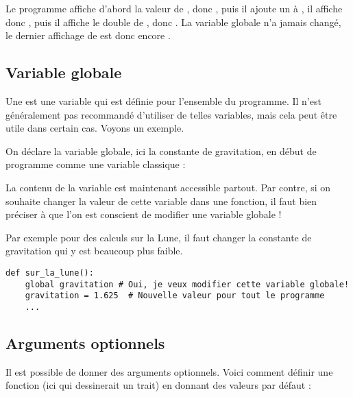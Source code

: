 \documentclass[11pt,class=report,crop=false]{standalone}
\begin{document}

Le programme affiche d'abord la valeur de , donc , puis il ajoute un à , il affiche donc , puis il affiche le double de , donc . La variable globale  n'a jamais changé, le dernier affichage de  est donc encore .

\subsection{Variable globale}

Une  est une variable qui est définie pour l'ensemble du programme. Il n'est généralement pas recommandé d'utiliser de telles variables, mais cela peut être utile dans certain cas. Voyons un exemple.

On déclare la variable globale, ici la constante de gravitation, en début de programme comme une variable classique : 

La contenu de la variable  est maintenant accessible partout.
Par contre, si on souhaite changer la valeur de cette variable dans une fonction, il faut bien préciser à \Python{} que l'on est conscient de modifier une variable globale !

Par exemple pour des calculs sur la Lune, il faut changer la constante de gravitation qui y est beaucoup plus faible.

\begin{lstlisting}
def sur_la_lune():
    global gravitation # Oui, je veux modifier cette variable globale!
    gravitation = 1.625  # Nouvelle valeur pour tout le programme    
    ...
\end{lstlisting}


\subsection{Arguments optionnels}


Il est possible de donner des arguments optionnels. Voici comment définir une fonction (ici qui dessinerait un trait) en donnant des valeurs par défaut :
 
\end{document}
